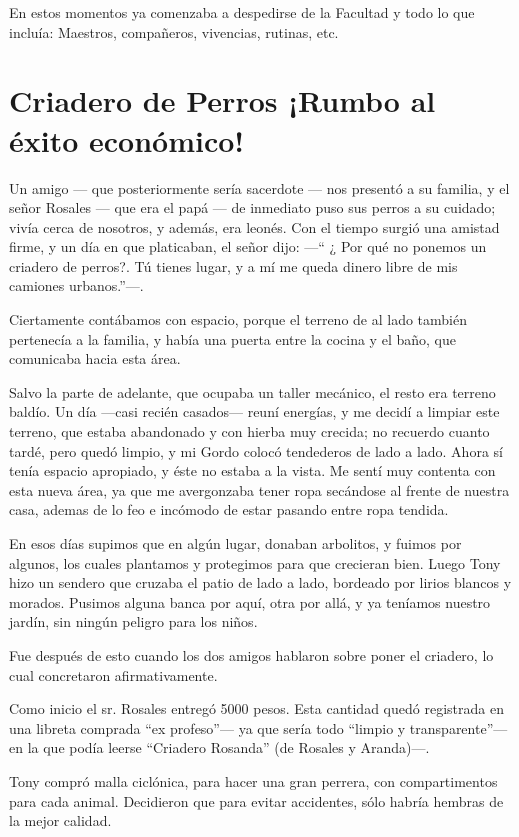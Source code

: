 \documentclass[letterpaper, 12pt]{book}
\begin{document}
En estos momentos ya comenzaba a despedirse de la Facultad y todo lo que incluía: Maestros, compañeros, vivencias, rutinas, etc.

\chapter{Criadero de Perros ¡Rumbo al éxito económico!}
Un amigo --- que posteriormente sería sacerdote --- nos presentó a su familia, y el señor Rosales --- que era el papá --- de inmediato puso sus perros a su cuidado; vivía cerca de nosotros, y además, era leonés. Con el tiempo surgió una amistad firme, y un día en  que platicaban, el señor dijo: ---`` ¿ Por qué no ponemos un criadero de perros?. Tú tienes lugar, y a mí me queda dinero libre de mis camiones urbanos.''---.

Ciertamente contábamos con espacio, porque el terreno de al lado también pertenecía a la familia, y había una puerta entre la cocina y el baño, que comunicaba hacia esta área.

Salvo la parte de adelante, que ocupaba un taller mecánico, el resto era terreno baldío. Un día ---casi recién casados--- reuní energías, y me decidí a limpiar este terreno, que estaba abandonado y con hierba muy crecida; no recuerdo cuanto tardé, pero quedó limpio, y mi Gordo colocó tendederos de lado a lado. Ahora sí tenía espacio apropiado, y éste no estaba a la vista. Me sentí muy contenta con esta nueva área, ya que me avergonzaba tener ropa secándose al frente de nuestra casa, ademas de lo feo e incómodo de estar pasando entre ropa tendida.

En esos días supimos que en algún lugar, donaban arbolitos, y fuimos por algunos, los cuales plantamos y protegimos para que crecieran bien. Luego Tony hizo un sendero que cruzaba el patio de lado a lado, bordeado por lirios blancos y morados. Pusimos alguna banca por aquí, otra por allá, y ya teníamos nuestro jardín, sin ningún peligro para los niños.

Fue después de esto cuando los dos amigos hablaron sobre poner el criadero, lo cual concretaron afirmativamente.

Como inicio el sr. Rosales entregó 5000 pesos. Esta cantidad quedó registrada en una libreta comprada ``ex profeso''--- ya que sería todo ``limpio y transparente''--- en la que podía leerse ``Criadero Rosanda'' (de Rosales y Aranda)---.

Tony compró malla ciclónica, para hacer una gran perrera, con compartimentos para cada animal. Decidieron que para evitar accidentes, sólo habría hembras de la mejor calidad.
\end{document}
